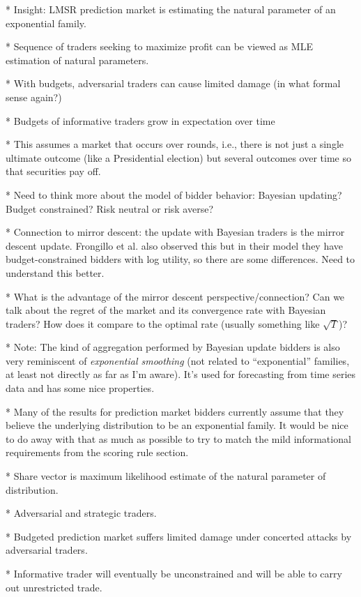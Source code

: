 \documentclass[11pt,letterpaper]{article}
\begin{document}
* Insight: LMSR prediction market is estimating the natural parameter of an exponential family.

* Sequence of traders seeking to maximize profit can be viewed as MLE estimation of natural parameters.

* With budgets, adversarial traders can cause limited damage (in what formal sense again?)

* Budgets of informative traders grow in expectation over time

* This assumes a market that occurs over rounds, i.e., there is not just a single ultimate outcome (like a Presidential election) but several outcomes over time so that securities pay off.

* Need to think more about the model of bidder behavior: Bayesian updating? Budget constrained? Risk neutral or risk averse?

* Connection to mirror descent: the update with Bayesian traders is the mirror descent update. Frongillo et al. also observed this but in their model they have budget-constrained bidders with log utility, so there are some differences. Need to understand this better.

* What is the advantage of the mirror descent perspective/connection? Can we talk about the regret of the market and its convergence rate with Bayesian traders? How does it compare to the optimal rate (usually something like $\sqrt{T}$)?

* Note: The kind of aggregation performed by Bayesian update bidders is also very reminiscent of \emph{exponential smoothing} (not related to ``exponential'' families, at least not directly as far as I'm aware). It's used for forecasting from time series data and has some nice properties.

* Many of the results for prediction market bidders currently assume that they believe the underlying distribution to be an exponential family. It would be nice to do away with that as much as possible to try to match the mild informational requirements from the scoring rule section.

* Share vector is maximum likelihood estimate of the natural parameter of distribution.

* Adversarial and strategic traders.

* Budgeted prediction market suffers limited damage under concerted attacks by adversarial traders.

* Informative trader will eventually be unconstrained and will be able to carry out unrestricted trade.
\end{document}
